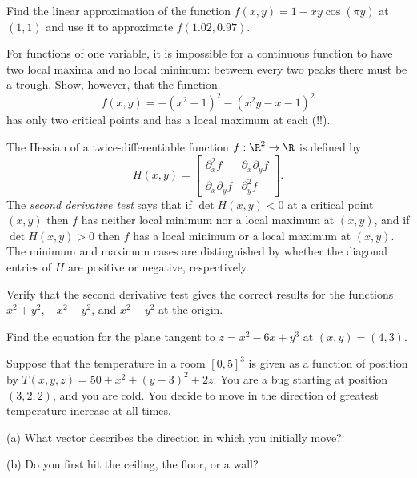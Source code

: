 \documentclass{watsonbook}
\begin{document}
\begin{aexercise}
  Find the linear approximation of the function
  $f(x,y) = 1-xy\cos(\pi y)$ at $(1,1)$ and use it to approximate
  $f(1.02,0.97)$.
\end{aexercise}


\begin{aexercise}
  For functions of one variable, it is impossible for a continuous
  function to have two local maxima and no local minimum: between
  every two peaks there must be a trough. Show, however, that the
  function
  \[
    f(x,y) = -(x^2-1)^2-(x^2y-x-1)^2
  \]
  has only two critical points and has a local maximum at each (!!). 
\end{aexercise}


\begin{aexercise}
  The Hessian of a twice-differentiable function $f:\R^2 \to \R$ is
  defined by
  \[
    H(x,y) = \left[
      \begin{array}{cc}
        \partial_x^2 f & \partial_x\partial_y f \\
        \partial_x\partial_y f & \partial_y^2 f
      \end{array}
    \right]. 
  \]
  The \textit{second derivative test} says that if $\det H(x,y) < 0$
  at a critical point $(x,y)$ then $f$ has neither local minimum nor a
  local maximum at $(x,y)$, and if $\det H(x,y) > 0$ then $f$ has a
  local minimum or a local maximum at $(x,y)$. The minimum and maximum
  cases are distinguished by whether the diagonal entries of $H$ are
  positive or negative, respectively.

  Verify that the second derivative test gives the correct results for
  the functions $x^2+y^2$, $-x^2-y^2$, and $x^2 - y^2$ at the origin.
\end{aexercise}


\begin{aexercise}
  Find the equation for the plane tangent to $z=x^2-6x+y^3$ at
  $(x,y) = (4,3)$.
\end{aexercise}

\begin{aexercise}
  Suppose that the temperature in a room $[0,5]^3$ is given as a
  function of position by $T(x,y,z) = 50 + x^2 + (y-3)^2 + 2z$. You
  are a bug starting at position $(3,2,2)$, and you are cold. You
  decide to move in the direction of greatest temperature increase at
  all times.

  (a) What vector describes the direction in which you initially move?

  (b) Do you first hit the ceiling, the floor, or a wall?
\end{aexercise}
\end{document}
